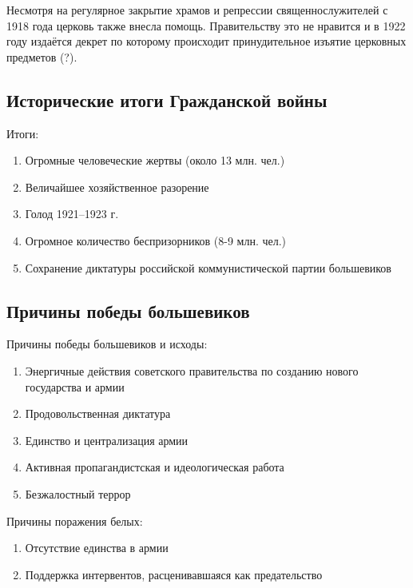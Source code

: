 Несмотря на регулярное закрытие храмов и репрессии священнослужителей с 1918 года церковь также внесла помощь. Правительству это не нравится и в 1922 году издаётся декрет по которому происходит принудительное изъятие церковных предметов (?).

\subsection{Исторические итоги Гражданской войны}

Итоги:
\begin{enumerate}
	\item Огромные человеческие жертвы (около 13 млн. чел.)
	\item Величайшее хозяйственное разорение
	\item Голод 1921--1923 г.
	\item Огромное количество беспризорников (8-9 млн. чел.) 
	\item Сохранение диктатуры российской коммунистической партии большевиков
\end{enumerate}

\subsection{Причины победы большевиков}

Причины победы большевиков и исходы:
\begin{enumerate}
	\item Энергичные действия советского правительства по созданию нового государства и армии
	\item Продовольственная диктатура
	\item Единство и централизация армии
	\item Активная пропагандистская и идеологическая работа
	\item Безжалостный террор
\end{enumerate}

Причины поражения белых:
\begin{enumerate}
	\item Отсутствие единства в армии
	\item Поддержка интервентов, расценивавшаяся как предательство
\end{enumerate}
